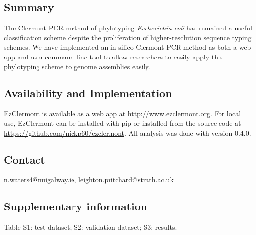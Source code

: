 
\subsection*{Summary}
The Clermont PCR method of phylotyping \textit{Escherichia coli} has remained a useful classification scheme despite the proliferation of higher-resolution sequence typing schemes. We have implemented an in silico Clermont PCR method as both a web app and as a command-line tool to allow researchers to easily apply this phylotyping scheme to genome assemblies easily.
\subsection*{Availability and Implementation}
EzClermont is available as a web app at  \url{http://www.ezclermont.org}.  For local use, EzClermont can be installed with pip or installed from the source code at \url{https://github.com/nickp60/ezclermont}. All analysis was done with version 0.4.0.
\subsection*{Contact}
n.waters4@nuigalway.ie, leighton.pritchard@strath.ac.uk
\subsection*{Supplementary information}
Table S1: test dataset; S2: validation dataset; S3: results.
